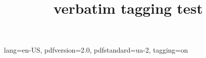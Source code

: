 \ifdefined\Uchar\RequirePackage{luatagging}\fi
\DocumentMetadata
  {
    lang=en-US,
    pdfversion=2.0,
    pdfstandard=ua-2,
    tagging=on
  }
\begin{filecontents*}{tst.tex}
Some verbatim text
}%
\end{filecontents*}
\documentclass{article}
\usepackage{verbatim}

\title{verbatim tagging test}





\begin{verbatim}
Some verbatim text
}% ^_
\end{verbatim}

